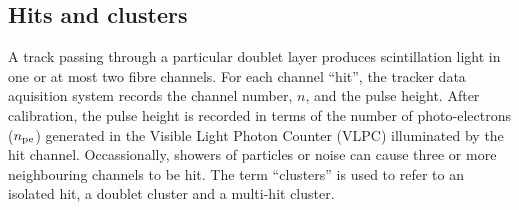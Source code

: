 \subsection{Hits and clusters}
\label{HtsClstrs}

A track passing through a particular doublet layer produces
scintillation light in one or at most two fibre channels.
For each channel ``hit'', the tracker data aquisition system records
the channel number, $n$, and the pulse height.
After calibration, the pulse height is recorded in terms of the number
of photo-electrons ($n_{\rm pe}$) generated in the Visible Light
Photon Counter (VLPC) illuminated by the hit channel.
Occassionally, showers of particles or noise can cause three or more
neighbouring channels to be hit. 
The term ``clusters'' is used to refer to an isolated hit, a doublet
cluster and a multi-hit cluster.

